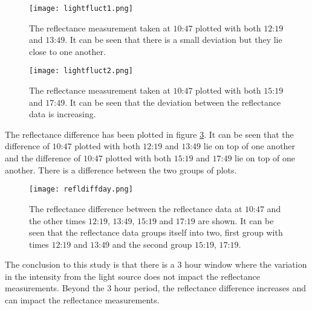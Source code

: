 \documentclass[MasterThesisMain.tex]{subfiles}
\begin{document}
\begin{figure}
\centering
\texttt{[image: lightfluct1.png]}
\caption{The reflectance measurement taken at $10$:$47$ plotted with both $12$:$19$ and $13$:$49$. It can be seen that there is a small deviation but they lie close to one another.}
\label{fig:day1}
\end{figure}

\begin{figure}
\centering
\texttt{[image: lightfluct2.png]}
\caption{The reflectance measurement taken at $10$:$47$ plotted with both $15$:$19$ and $17$:$49$. It can be seen that the deviation between the reflectance data is increasing.}
\label{fig:day2}
\end{figure}

The reflectance difference has been plotted in figure \ref{fig:day3}. It can be seen that the difference of $10$:$47$ plotted with both $12$:$19$ and $13$:$49$ lie on top of one another and the difference of $10$:$47$ plotted with both $15$:$19$ and $17$:$49$ lie on top of one another. There is a difference between the two groups of plots.

\begin{figure}
\centering
\texttt{[image: refldiffday.png]}
\caption{The reflectance difference between the reflectance data at $10$:$47$ and the other times $12$:$19$, $13$:$49$, $15$:$19$ and $17$:$19$ are shown. It can be seen that the reflectance data groups itself into two, first group with times $12$:$19$ and $13$:$49$ and the second group $15$:$19$, $17$:$19$.}
\label{fig:day3}
\end{figure}
\pagebreak
The conclusion to this study is that there is a $3$ hour window where the variation in the intensity from the light source does not impact the reflectance measurements. Beyond the $3$ hour period, the reflectance difference increases and can impact the reflectance measurements.

	
\end{document}
